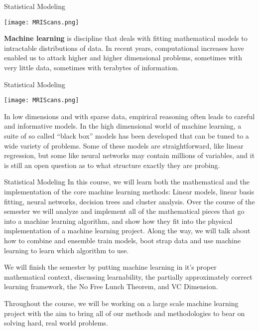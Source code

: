 \documentclass[10pt, handout]{beamer}
\begin{document}
\begin{frame}[t]{Statistical Modeling}
  \begin{minipage}[t][0.5\textheight][t]{\textwidth}
    \centering
     \texttt{[image: MRIScans.png]}
  \end{minipage}
  \vfill
  \begin{minipage}[t][0.5\textheight][t]{\textwidth}
\textbf{Machine learning} is discipline that deals with fitting mathematical models to intractable distributions of data. In recent years, computational increases have enabled us to attack higher and higher dimensional  problems, sometimes with very little data, sometimes with terabytes of information. 
  \end{minipage}
\end{frame}



\begin{frame}[t]{Statistical Modeling}
  \begin{minipage}[t][0.5\textheight][t]{\textwidth}
    \centering
     \texttt{[image: MRIScans.png]}
  \end{minipage}
  \vfill
  \begin{minipage}[t][0.5\textheight][t]{\textwidth}
In low dimensions and with sparse data, empirical reasoning often leads to careful and informative models. In the high dimensional world of machine learning, a suite of so called ``black box'' models has been developed that can be tuned to a wide variety of problems. Some of these models are straightforward, like linear regression, but some like neural networks may contain millions of variables, and it is still an open question as to what structure exactly they are probing. 
  \end{minipage}
\end{frame}


\begin{frame}[t]{Statistical Modeling}
In this course, we will learn both the mathematical and the implementation of the core machine learning methods: Linear models, linear basis fitting, neural networks, decision trees and cluster analysis. Over the course of the semester we will analyze and implement all of the mathematical pieces that go into a machine learning algorithm, and show how they fit into the physical implementation of a machine learning project. Along the way, we will talk about how to combine and ensemble train models, boot strap data and use machine learning to learn which algorithm to use.

We will finish the semester by putting machine learning in it's proper mathematical context, discussing learnability, the partially approximately correct learning framework, the No Free Lunch Theorem, and VC Dimension. 

Throughout the course, we will be working on a large scale machine learning project with the aim to bring all of our methods and methodologies to bear on solving hard, real world problems. 
\end{frame}
\end{document}
